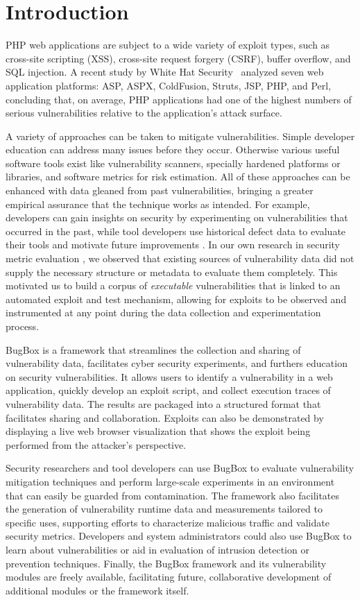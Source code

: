 \documentclass[letterpaper,twocolumn,10pt]{article}
\begin{document}
\section{Introduction}
PHP web applications are subject to a wide variety of exploit types, such as cross-site scripting (XSS), cross-site request forgery (CSRF), buffer overflow, and SQL injection.  A recent study by White Hat Security~\cite{WhiteHat:2010:Online} analyzed seven web application platforms: ASP, ASPX, ColdFusion, Struts, JSP, PHP, and Perl, concluding that, on average, PHP applications had one of the highest numbers of serious vulnerabilities relative to the application's attack surface.

A variety of approaches can be taken to mitigate vulnerabilities. Simple developer education can address many issues before they occur. Otherwise various useful software tools exist like vulnerability scanners, specially hardened platforms or libraries, and software metrics for risk estimation. All of these approaches can be enhanced with data gleaned from past vulnerabilities, bringing a greater empirical assurance that the technique works as intended. For example, developers can gain insights on security by experimenting on vulnerabilities that occurred in the past, while tool developers use historical defect data to evaluate their tools and motivate future improvements \cite{miningbugfinding}. In our own research in security metric evaluation \cite{metrisec2012surface}, we observed that existing sources of vulnerability data did not supply the necessary structure or metadata to evaluate them completely. This motivated us to build a corpus of \textit{executable} vulnerabilities that is linked to an automated exploit and test mechanism, allowing for exploits to be observed and instrumented at any point during the data collection and experimentation process.

BugBox is a framework that streamlines the collection and sharing of vulnerability data, facilitates cyber security experiments, and furthers education on security vulnerabilities. It allows users to identify a vulnerability in a web application, quickly develop an exploit script, and collect execution traces of vulnerability data. The results are packaged into a structured format that facilitates sharing and collaboration. Exploits can also be demonstrated by displaying a live web browser visualization that shows the exploit being performed from the attacker's perspective.

Security researchers and tool developers can use BugBox to evaluate vulnerability mitigation techniques and perform large-scale experiments in an environment that can easily be guarded from contamination. The framework also facilitates the generation of vulnerability runtime data and measurements tailored to specific uses, supporting efforts to characterize malicious traffic and validate security metrics. Developers and system administrators could also use BugBox to learn about vulnerabilities or aid in evaluation of intrusion detection or prevention techniques. Finally, the BugBox framework and its vulnerability modules are freely available, facilitating future, collaborative development of additional modules or the framework itself.
\end{document}
